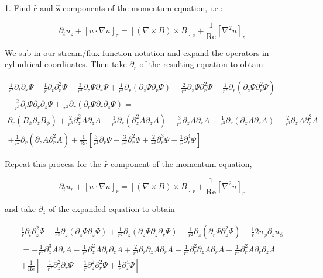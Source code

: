 \documentclass{paper}
\newcommand{\beq}{\begin{equation}}
\newcommand{\eeq}{\end{equation}}
\newcommand{\rhat}{\ensuremath{\mathbf{\hat{r}}}}
\newcommand{\zhat}{\ensuremath{\mathbf{\hat{z}}}}
\newcommand\reye{\mathrm{Re}}
\begin{document}
1. Find $\rhat$ and $\zhat$ components of the momentum equation, i.e.:

\beq
\partial_t u_z + \left[u \cdot \nabla u \right]_z = \left[ \left( \nabla \times B \right) \times B \right]_z + \frac{1}{\reye}\left[ \nabla^2 u \right] _z
\eeq

We sub in our stream/flux function notation and expand the operators in cylindrical coordinates. Then take $\partial_r$ of the resulting equation to obtain:

\begin{multline}
\frac{1}{r^2} \partial_t \partial_r \Psi - \frac{1}{r} \partial_t \partial_r^2 \Psi - \frac{3}{r^4}\partial_z \Psi \partial_r \Psi + \frac{1}{r^3} \partial_r \left( \partial_z \Psi \partial_r \Psi \right) + \frac{2}{r^3} \partial_z \Psi \partial_r^2 \Psi - \frac{1}{r^2} \partial_r \left(\partial_z \Psi \partial_r^2 \Psi \right)\\
- \frac{2}{r^3} \partial_r \Psi \partial_r\partial_z \Psi + \frac{1}{r^2} \partial_r \left(\partial_r \Psi \partial_r \partial_z \Psi\right) = \\
\partial_r\left(B_\phi \partial_z B_\phi\right) + \frac{2}{r^3} \partial_z^2 A \partial_z A - \frac{1}{r^2} \partial_r \left(\partial_z^2 A \partial_z A\right) + \frac{3}{r^4} \partial_z A \partial_r A - \frac{1}{r^3} \partial_r \left(\partial_z A \partial_r A \right) - \frac{2}{r^3} \partial_z A \partial_r^2 A \\
+ \frac{1}{r^2} \partial_r \left(\partial_z A \partial_r^2 A \right) 
+ \frac{1}{\reye} \left[\frac{3}{r^4} \partial_r \Psi - \frac{3}{r^3} \partial_r^2 \Psi + \frac{2}{r^2} \partial_r^3 \Psi - \frac{1}{r} \partial_r^4 \Psi\right]
\end{multline}

Repeat this process for the $\rhat$ component of the momentum equation,

\beq
\partial_t u_r + \left[u \cdot \nabla u \right]_r = \left[ \left( \nabla \times B \right) \times B \right]_r + \frac{1}{\reye}\left[ \nabla^2 u \right] _r
\eeq

and take $\partial_z$ of the expanded equation to obtain

\begin{multline}
\frac{1}{r} \partial_t \partial_z^2 \Psi - \frac{1}{r^3} \partial_z \left(\partial_z \Psi \partial_z \Psi\right) + \frac{1}{r^2} \partial_z\left(\partial_z\Psi \partial_z\partial_r \Psi\right) - \frac{1}{r^2} \partial_z \left(\partial_r \Psi \partial_z^2 \Psi\right) - \frac{1}{r} 2 u_\phi \partial_z u_\phi \\
= - \frac{1}{r^2} \partial_z^3 A \partial_r A - \frac{1}{r^2} \partial_z^2 A \partial_r \partial_z A + \frac{2}{r^3} \partial_r\partial_z A \partial_r A - \frac{1}{r^2} \partial_r^2 \partial_z A \partial_rA - \frac{1}{r^2} \partial_r^2 A \partial_r \partial_z A \\
+ \frac{1}{\reye} \left[ -\frac{1}{r^2} \partial_z^2 \partial_r \Psi + \frac{1}{r} \partial_z^2 \partial_r^2 \Psi + \frac{1}{r} \partial_z^4\Psi \right]
\end{multline}
\end{document}
